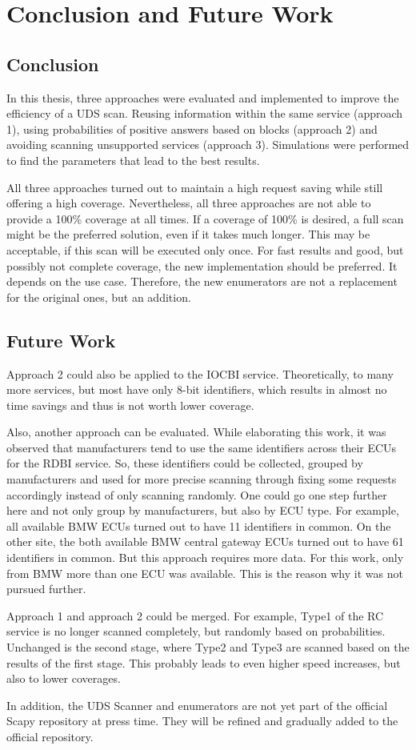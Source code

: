 \section{Conclusion and Future Work}

\subsection{Conclusion}

In this thesis, three approaches were evaluated and implemented to improve the efficiency of a UDS scan. Reusing information within the same service (approach 1), using probabilities of positive answers based on blocks (approach 2) and avoiding scanning unsupported services (approach 3). Simulations were performed to find the parameters that lead to the best results.

All three approaches turned out to maintain a high request saving while still offering a high coverage.
Nevertheless, all three approaches are not able to provide a 100\% coverage at all times. 
If a coverage of 100\% is desired, a full scan might be the preferred solution, even if it takes much longer. This may be acceptable, if this scan will be executed only once. For fast results and good, but possibly not complete coverage, the new implementation should be preferred. It depends on the use case. Therefore, the new enumerators are not a replacement for the original ones, but an addition.

\subsection{Future Work}

Approach 2 could also be applied to the IOCBI service. Theoretically, to many more services, but most have only 8-bit identifiers, which results in almost no time savings and thus is not worth lower coverage.

Also, another approach can be evaluated. While elaborating this work, it was observed that manufacturers tend to use the same identifiers across their ECUs for the RDBI service. So, these identifiers could be collected, grouped by manufacturers and used for more precise scanning through fixing some requests accordingly instead of only scanning randomly. One could go one step further here and not only group by manufacturers, but also by ECU type.
For example, all available BMW ECUs turned out to have 11 identifiers in common. On the other site, the both available BMW central gateway ECUs turned out to have 61 identifiers in common. But this approach requires more data. For this work, only from BMW more than one ECU was available. This is the reason why it was not pursued further.

Approach 1 and approach 2 could be merged. For example, Type1 of the RC service is no longer scanned completely, but randomly based on probabilities. Unchanged is the second stage, where Type2 and Type3 are scanned based on the results of the first stage. This probably leads to even higher speed increases, but also to lower coverages.

In addition, the UDS Scanner and enumerators are not yet part of the official Scapy repository at press time. They will be refined and gradually added to the official repository.
